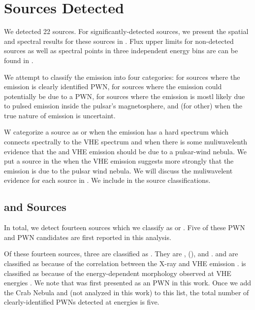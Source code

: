 \section{Sources Detected}



We detected 22 sources.  For significantly-detected
sources, we present
the spatial and spectral results for these sources in
.
Flux upper limits for non-detected sources
as well as spectral points in three independent energy
bins are can be found in
\cite{acero_2013a_constraints-galactic}.


We attempt to classify the \gev emission into four categories: \PWNClass
for sources where the \gev emission is clearly identified \ac{PWN},
\PWNcClass for sources where the \gev emission could potentially be due
to a \ac{PWN}, \PSRClass for sources where the emission is mostl likely
due to pulsed emission inside the pulsar's magnetosphere, and \OtherClass
(for other) when the true nature of emission is uncertaint.

W categorize a source 
as \PWNClass or \PWNcClass when the emission has a
hard spectrum which connects spectrally to the \ac{VHE} spectrum and when
there is some muliwavelenth evidence that the \gev and \ac{VHE} emission
should be due to a pulsar-wind nebula.  We put a source in the \PWNClass
when the \ac{VHE} emission suggests more strongly that the emission is
due to the pulsar wind nebula. We will discuss the muliwavelent evidence
for each \PWNClass source in .  We include
in  the source classifications.



\subsection{\PWNClass and \PWNcClass Sources}

In total, we detect fourteen sources which we classify as \PWNClass or
\PWNcClass. Five of these \ac{PWN} and \ac{PWN} candidates are first
reported in this analysis.

Of these fourteen sources, three are classified as \PWNClass.  They
are , \mshfifteenfiftytwo (), and .
 and \mshfifteenfiftytwo are classified as \PWNClass
because of the correlation between the X-ray and \ac{VHE} emission
\citep{h.e.s.s.collaboration_2011a_discovery-source,aharonian_2005a_discovery-extended}.
 is classified as \PWNClass because of the
energy-dependent morphology observed at \ac{VHE} energies
\citep{aharonian_2006a_energy-dependent}.  We note that 
was first presented as an \ac{PWN} in this work.  Once we add the Crab
Nebula and \velax (not analyzed in this work) to this list, the total
number of clearly-identified \acp{PWN} detected at \gev energies is five.

